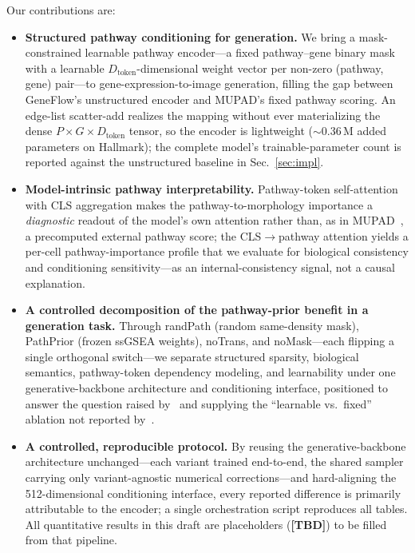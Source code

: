 \documentclass[journal]{IEEEtran}
\newcommand{\TBD}{{\color{red}\textbf{[TBD]}}}
\begin{document}
Our contributions are:
\begin{itemize}
  \item \textbf{Structured pathway conditioning for generation.} We bring a
  mask-constrained learnable pathway encoder---a fixed pathway--gene binary mask
  with a learnable $D_{\text{token}}$-dimensional weight vector per non-zero
  (pathway, gene) pair---to gene-expression-to-image generation, filling the gap
  between GeneFlow's unstructured encoder and MUPAD's fixed pathway scoring. An
  edge-list scatter-add realizes the mapping without ever materializing the dense
  $P\times G\times D_{\text{token}}$ tensor, so the encoder is lightweight
  ($\sim$0.36\,M added parameters on Hallmark); the complete model's
  trainable-parameter count is reported against the unstructured baseline in
  Sec.~\ref{sec:impl}.
  \item \textbf{Model-intrinsic pathway interpretability.} Pathway-token
  self-attention with CLS aggregation makes the pathway-to-morphology importance a
  \emph{diagnostic} readout of the model's own attention rather than, as in
  MUPAD~\cite{mupad}, a precomputed external pathway score; the
  CLS$\rightarrow$pathway attention yields a per-cell pathway-importance profile
  that we evaluate for biological consistency and conditioning sensitivity---as an
  internal-consistency signal, not a causal explanation.
  \item \textbf{A controlled decomposition of the pathway-prior benefit in a
  generation task.} Through randPath (random same-density mask), PathPrior (frozen ssGSEA
  weights), noTrans, and noMask---each flipping a single orthogonal switch---we
  separate structured sparsity, biological semantics, pathway-token dependency
  modeling, and learnability under one generative-backbone architecture and
  conditioning interface, positioned
  to answer the question raised by~\cite{sparsity} and supplying the ``learnable
  vs.\ fixed'' ablation not reported by~\cite{mupad}.
  \item \textbf{A controlled, reproducible protocol.} By reusing the generative-backbone
  architecture unchanged---each variant trained end-to-end, the shared sampler
  carrying only variant-agnostic numerical corrections---and hard-aligning the
  512-dimensional conditioning interface, every reported difference is primarily
  attributable to the encoder; a single
  orchestration script reproduces all tables. All quantitative results in this
  draft are placeholders (\TBD) to be filled from that pipeline.
\end{itemize}
\end{document}
